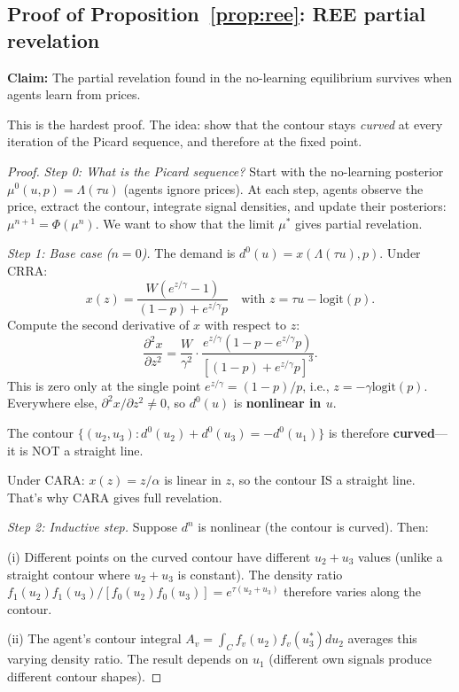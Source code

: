 \documentclass[12pt,letterpaper]{article}
\theoremstyle{definition}
\theoremstyle{remark}
\newcommand{\Lam}{\Lambda}            %
\newcommand{\logit}{\mathrm{logit}}
\newcommand{\1}{\mathbf{1}}
\begin{document}
\subsection*{Proof of Proposition~\ref{prop:ree}: REE partial revelation}

\textbf{Claim:} The partial revelation found in the no-learning
equilibrium survives when agents learn from prices.

This is the hardest proof. The idea: show that the contour stays
\emph{curved} at every iteration of the Picard sequence, and therefore
at the fixed point.

\begin{proof}
\emph{Step 0: What is the Picard sequence?}
Start with the no-learning posterior $\mu^0(u,p) = \Lam(\tau u)$ (agents
ignore prices). At each step, agents observe the price, extract the
contour, integrate signal densities, and update their posteriors:
$\mu^{n+1} = \Phi(\mu^n)$. We want to show that the limit $\mu^*$
gives partial revelation.

\emph{Step 1: Base case ($n=0$).}
The demand is $d^0(u) = x(\Lam(\tau u), p)$. Under CRRA:
\[
   x(z) = \frac{W(e^{z/\gamma} - 1)}{(1-p) + e^{z/\gamma} p}
   \quad \text{with } z = \tau u - \logit(p).
\]
Compute the second derivative of $x$ with respect to $z$:
\[
   \frac{\partial^2 x}{\partial z^2}
   = \frac{W}{\gamma^2} \cdot
     \frac{e^{z/\gamma}(1-p - e^{z/\gamma}p)}{[(1-p) + e^{z/\gamma}p]^3}.
\]
This is zero only at the single point $e^{z/\gamma} = (1-p)/p$, i.e.,
$z = -\gamma \logit(p)$. Everywhere else, $\partial^2 x/\partial z^2
\neq 0$, so $d^0(u)$ is \textbf{nonlinear in $u$}.

The contour $\{(u_2, u_3) : d^0(u_2) + d^0(u_3) = -d^0(u_1)\}$ is
therefore \textbf{curved}---it is NOT a straight line.

Under CARA: $x(z) = z/\alpha$ is linear in $z$, so the contour IS a
straight line. That's why CARA gives full revelation.

\emph{Step 2: Inductive step.}
Suppose $d^n$ is nonlinear (the contour is curved). Then:

(i) Different points on the curved contour have different
$u_2 + u_3$ values (unlike a straight contour where $u_2 + u_3$ is
constant). The density ratio
$f_1(u_2) f_1(u_3) / [f_0(u_2) f_0(u_3)] = e^{\tau(u_2 + u_3)}$
therefore varies along the contour.

(ii) The agent's contour integral $A_v = \int_C f_v(u_2) f_v(u_3^*) du_2$
averages this varying density ratio. The result depends on $u_1$
(different own signals produce different contour shapes).


\end{proof}
\end{document}
